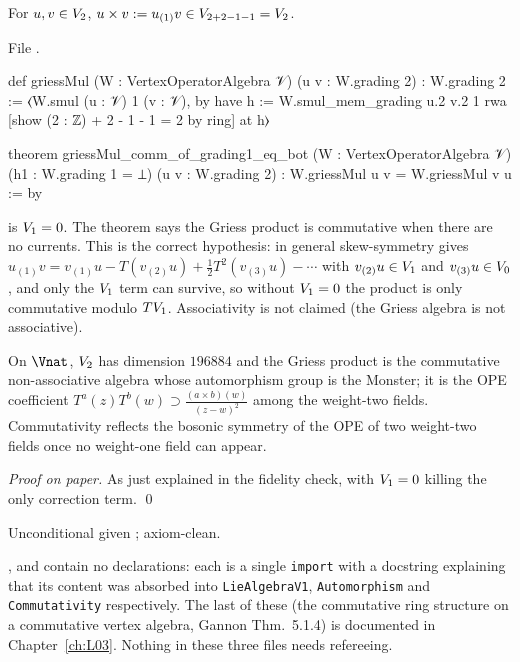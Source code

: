 \begin{definition}\label{l04:def:griess}
For $u,v\in V_2$, $u\times v := u_{(1)}v\in V_{2+2-1-1} = V_2$.
\end{definition}
\noindent File .
\begin{leancode}
def griessMul (W : VertexOperatorAlgebra 𝒱) (u v : W.grading 2) : W.grading 2 :=
  ⟨W.smul (u : 𝒱) 1 (v : 𝒱), by
    have h := W.smul_mem_grading u.2 v.2 1
    rwa [show (2 : ℤ) + 2 - 1 - 1 = 2 by ring] at h⟩

theorem griessMul_comm_of_grading1_eq_bot (W : VertexOperatorAlgebra 𝒱)
    (h1 : W.grading 1 = ⊥) (u v : W.grading 2) :
    W.griessMul u v = W.griessMul v u := by
\end{leancode}
\begin{dictionary}
 is $V_1 = 0$. The theorem says the Griess product is
commutative when there are no currents. This is the correct hypothesis: in general skew-symmetry
gives $u_{(1)}v = v_{(1)}u - T(v_{(2)}u) + \tfrac12T^2(v_{(3)}u)-\cdots$ with $v_{(2)}u\in V_1$ and
$v_{(3)}u\in V_0$, and only the $V_1$ term can survive, so without $V_1 = 0$ the
product is only commutative modulo $TV_1$. Associativity is not claimed (the Griess algebra is
not associative).
\end{dictionary}
\begin{physics}
On $\Vnat$, $V_2$ has dimension $196884$ and the Griess product is the commutative non-associative
algebra whose automorphism group is the Monster; it is the OPE coefficient $T^a(z)T^b(w)\supset
\frac{(a\times b)(w)}{(z-w)^2}$ among the weight-two fields. Commutativity reflects the bosonic
symmetry of the OPE of two weight-two fields once no weight-one field can appear.
\end{physics}
\emph{Proof on paper.} As just explained in the fidelity check, with $V_1 = 0$ killing the
only correction term. \qed
\begin{status}
Unconditional given ; axiom-clean.
\end{status}

\begin{remark}\label{l04:rem:stubs}
,  and
 contain no declarations: each is a single
\texttt{import} with a docstring explaining that its content was absorbed into
\texttt{LieAlgebraV1}, \texttt{Automorphism} and \texttt{Commutativity} respectively. The last of these
(the commutative ring structure on a commutative vertex algebra, Gannon Thm.~5.1.4) is documented in
Chapter~\ref{ch:L03}. Nothing in these three files needs refereeing.
\end{remark}

